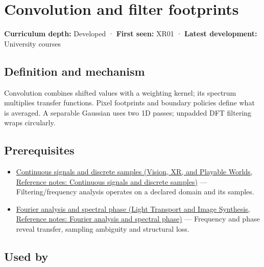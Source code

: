 \hypertarget{appendix-d5b3c692d9f0}{}\label{referencestart:appendix-d5b3c692d9f0}
\section{Convolution and filter footprints}\label{appendix-d5b3c692d9f0-convolution-and-filter-footprints}

\textbf{Curriculum depth:} Developed · \textbf{First seen:} XR01 · \textbf{Latest development:} University courses

\subsection{Definition and mechanism}\label{appendix-d5b3c692d9f0-definition-and-mechanism}

Convolution combines shifted values with a weighting kernel; its spectrum multiplies transfer functions. Pixel footprints and boundary policies define what is averaged. A separable Gaussian uses two 1D passes; unpadded DFT filtering wraps circularly.

\subsection{Prerequisites}\label{appendix-d5b3c692d9f0-prerequisites}

\begin{itemize}
\tightlist
\item
  \href{../07-Vision-XR-and-Playable-Worlds/main.pdf\#nameddest=appendix-1077ea8fc737}{Continuous signals and discrete samples (Vision, XR, and Playable Worlds, Reference notes: Continuous signals and discrete samples)} --- Filtering/frequency analysis operates on a declared domain and its samples.
\item
  \href{../04-Light-Transport-and-Image-Synthesis/main.pdf\#nameddest=appendix-b60686ba06a1}{Fourier analysis and spectral phase (Light Transport and Image Synthesis, Reference notes: Fourier analysis and spectral phase)} --- Frequency and phase reveal transfer, sampling ambiguity and structural loss.
\end{itemize}

\subsection{Used by}\label{appendix-d5b3c692d9f0-used-by}

